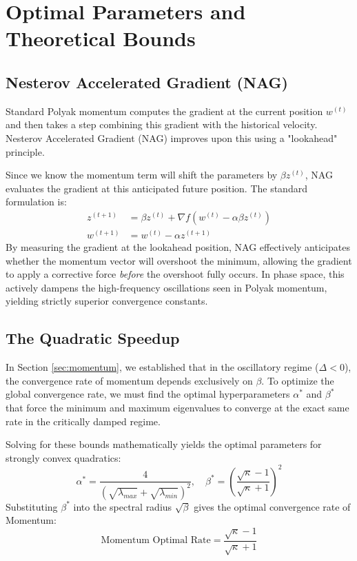 \section{Optimal Parameters and Theoretical Bounds}
\label{sec:bounds}

\subsection{Nesterov Accelerated Gradient (NAG)}
Standard Polyak momentum computes the gradient at the current position $w^{(t)}$ and then takes a step combining this gradient with the historical velocity. Nesterov Accelerated Gradient (NAG) \cite{nesterov1983method} improves upon this using a "lookahead" principle. 

Since we know the momentum term will shift the parameters by $\beta z^{(t)}$, NAG evaluates the gradient at this anticipated future position. The standard formulation is:
\begin{align}
    z^{(t+1)} &= \beta z^{(t)} + \nabla f(w^{(t)} - \alpha \beta z^{(t)}) \\
    w^{(t+1)} &= w^{(t)} - \alpha z^{(t+1)}
\end{align}
By measuring the gradient at the lookahead position, NAG effectively anticipates whether the momentum vector will overshoot the minimum, allowing the gradient to apply a corrective force \textit{before} the overshoot fully occurs. In phase space, this actively dampens the high-frequency oscillations seen in Polyak momentum, yielding strictly superior convergence constants.

\subsection{The Quadratic Speedup}
In Section \ref{sec:momentum}, we established that in the oscillatory regime ($\Delta < 0$), the convergence rate of momentum depends exclusively on $\beta$. To optimize the global convergence rate, we must find the optimal hyperparameters $\alpha^*$ and $\beta^*$ that force the minimum and maximum eigenvalues to converge at the exact same rate in the critically damped regime. 

Solving for these bounds mathematically yields the optimal parameters for strongly convex quadratics:
\begin{equation}
    \alpha^* = \frac{4}{(\sqrt{\lambda_{max}} + \sqrt{\lambda_{min}})^2}, \quad \beta^* = \left( \frac{\sqrt{\kappa} - 1}{\sqrt{\kappa} + 1} \right)^2
\end{equation}
Substituting $\beta^*$ into the spectral radius $\sqrt{\beta}$ gives the optimal convergence rate of Momentum:
\begin{equation}
    \text{Momentum Optimal Rate} = \frac{\sqrt{\kappa} - 1}{\sqrt{\kappa} + 1}
\end{equation}

